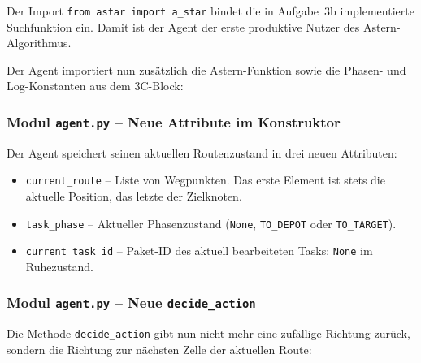 Der Import \texttt{from astar import a\_star} bindet die in Aufgabe~3b implementierte Suchfunktion ein. Damit ist der Agent der erste produktive Nutzer des \acs{Astern}-Algorithmus.



Der Agent importiert nun zusätzlich die \acs{Astern}-Funktion sowie die Phasen- und Log-Konstanten aus dem 3C-Block:




\subsubsection{Modul \texttt{agent.py} – Neue Attribute im Konstruktor}

Der Agent speichert seinen aktuellen Routenzustand in drei neuen Attributen:



\begin{itemize}
    \item \texttt{current\_route} -- Liste von Wegpunkten. Das erste Element ist stets die aktuelle Position, das letzte der Zielknoten.
    \item \texttt{task\_phase} -- Aktueller Phasenzustand (\texttt{None}, \texttt{TO\_DEPOT} oder \texttt{TO\_TARGET}).
    \item \texttt{current\_task\_id} -- Paket-ID des aktuell bearbeiteten Tasks; \texttt{None} im Ruhezustand.
\end{itemize}


\subsubsection{Modul \texttt{agent.py} – Neue \texttt{decide\_action}}

Die Methode \texttt{decide\_action} gibt nun nicht mehr eine zufällige Richtung zurück, sondern die Richtung zur nächsten Zelle der aktuellen Route:

